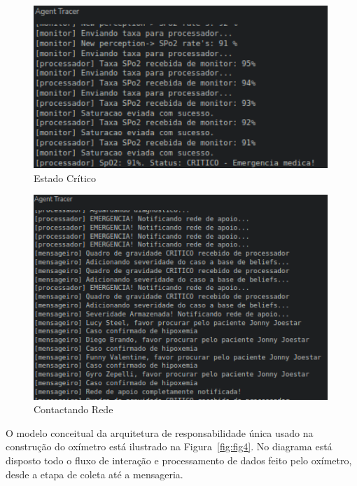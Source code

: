 \begin{figure}[H]
  \centering
  \includegraphics[width=0.99\textwidth]{assets/img/perception.emergency - Copia.png}
  \caption{Estado Crítico}
  \label{fig:fig2}
\end{figure}


\begin{figure}[H]
  \centering
  \includegraphics[width=0.99\textwidth]{assets/img/netwokcall - Copia.png}
  \caption{Contactando Rede}
  \label{fig:fig3}
\end{figure}

O modelo conceitual da arquitetura de responsabilidade única usado na construção do oxímetro está ilustrado na Figura~\ref{fig:fig4}. 
No diagrama está disposto todo o fluxo de interação e processamento de dados feito pelo oxímetro, desde a etapa de coleta até a mensageria.

